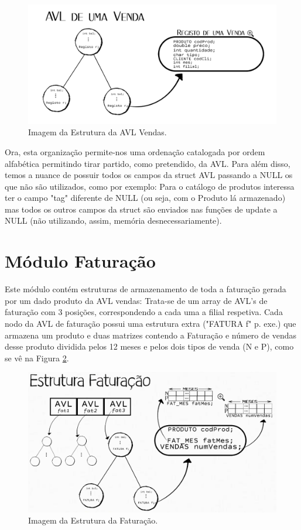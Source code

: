 \documentclass[a4paper,11pt]{report}
\begin{document}
\begin{figure}[h!]
  \centering
  \includegraphics[scale=0.20]{Avl_Venda.png}
  \caption{Imagem da Estrutura da AVL Vendas.}
  \label{fig1}
\end{figure}


Ora, esta organização permite-nos uma ordenação catalogada por ordem alfabética permitindo tirar partido, como pretendido, da AVL. Para além disso, temos a nuance de possuir todos os campos da struct AVL passando a NULL os que não são utilizados, como por exemplo: Para o catálogo de produtos interessa ter o campo "tag" diferente de NULL (ou seja, com o Produto lá armazenado) mas todos os outros campos da struct são enviados nas funções de update a NULL (não utilizando, assim, memória desnecessariamente).

\section{Módulo Faturação}
\quad Este módulo contém estruturas de armazenamento de toda a faturação gerada por um dado produto da AVL vendas: Trata-se de um array de AVL's de faturação com 3 posições, correspondendo a cada uma a filial respetiva. Cada nodo da AVL de faturação possui uma estrutura extra ("FATURA f" p. exe.) que armazena um produto e duas matrizes contendo a Faturação e número de vendas desse produto dividida pelos 12 meses e pelos dois tipos de venda (N e P), como se vê na Figura \ref{fig3}.

\begin{figure}[h!]
  \centering
  \includegraphics[scale=0.20]{Faturacao.png}
  \caption{Imagem da Estrutura da Faturação.}
  \label{fig3}
\end{figure}
\end{document}
